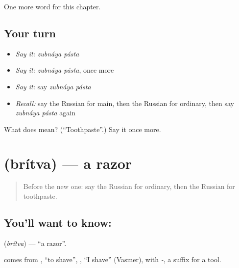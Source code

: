 \begin{grammarlens}[title={What you've built}]
One more word for this chapter.
\end{grammarlens}

\subsection*{Your turn}
\begin{itemize}
\raggedright
  \item \emph{Say it:} \emph{zubnáya pásta}
  \item \emph{Say it:} \emph{zubnáya pásta}, once more
  \item \emph{Say it:} say \emph{zubnáya pásta}
  \item \emph{Recall:} say the Russian for main, then the Russian for ordinary, then say \emph{zubnáya pásta} again
\end{itemize}

\begin{tcolorbox}[breakable,colback=teal!4,colframe=teal!35!black,title={Before you move on}]
What does   mean? (\textquotedblleft{}Toothpaste\textquotedblright{}.) Say it once more.
\end{tcolorbox}
\section[\texorpdfstring{\ru{бритва} (brítva)}{бритва (brítva)}]{ (brítva) — a razor}

\label{lesson:RU-C219-britva}



\begin{quote}
Before the new one: say the Russian for ordinary, then the Russian for toothpaste.
\end{quote}

\subsection*{You'll want to know: }
\textbf{} (\emph{brítva}) — \textquotedblleft{}a razor\textquotedblright{}.

\begin{cousinweb}
\textbf{} comes from \emph{}, \textquotedblleft{}to shave\textquotedblright{}, \emph{}, \textquotedblleft{}I shave\textquotedblright{} (Vasmer), with \emph{-}, a suffix for a tool.
\end{cousinweb}

